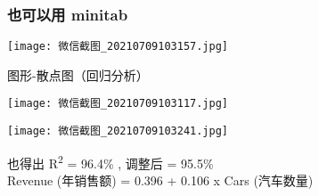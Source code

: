 \hypertarget{ux4e5fux53efux4ee5ux7528-minitab}{%
\subsubsection{也可以用
minitab}\label{ux4e5fux53efux4ee5ux7528-minitab}}


\texttt{[image: 微信截图\_20210709103157.jpg]}

图形-散点图（回归分析）


\texttt{[image: 微信截图\_20210709103117.jpg]}


\texttt{[image: 微信截图\_20210709103241.jpg]}

也得出 R\textsuperscript{2} = 96.4\% , 调整后 = 95.5\%\\
Revenue (年销售额) = 0.396 + 0.106 x Cars (汽车数量)\\

\cite{MA1References1}
\cite{MA1References2}
\cite{MA1References3}

